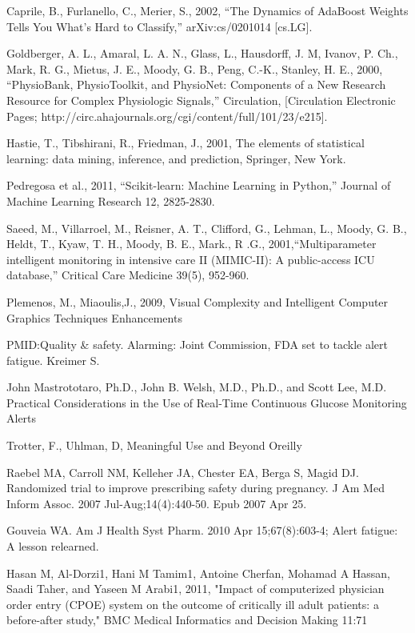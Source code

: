 \documentclass[12pt]{article}
\begin{document}
\begin{thebibliography}{1}
Caprile, B., Furlanello, C., Merier, S., 2002, ``The Dynamics of AdaBoost Weights Tells You What's Hard to Classify,'' arXiv:cs/0201014 [cs.LG].

Goldberger, A. L., Amaral, L. A. N., Glass, L., Hausdorff, J. M, Ivanov, P. Ch., Mark, R. G., Mietus, J. E., Moody, G. B., Peng, C.-K., Stanley, H. E., 2000, ``PhysioBank, PhysioToolkit, and PhysioNet: Components of a New Research Resource for Complex Physiologic Signals,'' Circulation, [Circulation Electronic Pages; http://circ.ahajournals.org/cgi/content/full/101/23/e215].

Hastie, T., Tibshirani, R., Friedman, J., 2001, The elements of statistical learning: data mining, inference, and prediction, Springer, New York.

Pedregosa et al., 2011, ``Scikit-learn: Machine Learning in Python,'' Journal of Machine Learning Research 12, 2825-2830.

Saeed, M., Villarroel, M., Reisner, A. T., Clifford, G., Lehman, L., Moody, G. B., Heldt, T., Kyaw, T. H., Moody, B. E., Mark., R .G., 2001,``Multiparameter intelligent monitoring in intensive care II (MIMIC-II): A public-access ICU database,'' Critical Care Medicine 39(5), 952-960.


Plemenos, M., Miaoulis,J., 2009, Visual Complexity and Intelligent Computer Graphics Techniques Enhancements


PMID:Quality \& safety. Alarming: Joint Commission, FDA set to tackle alert fatigue. Kreimer S.

John Mastrototaro, Ph.D., John B. Welsh, M.D., Ph.D., and Scott Lee, M.D.
Practical Considerations in the Use of Real-Time Continuous Glucose Monitoring Alerts

Trotter, F., Uhlman, D, Meaningful Use and Beyond Oreilly

Raebel MA, Carroll NM, Kelleher JA, Chester EA, Berga S, Magid DJ.
Randomized trial to improve prescribing safety during pregnancy.
J Am Med Inform Assoc. 2007 Jul-Aug;14(4):440-50. Epub 2007 Apr 25.

Gouveia WA. Am J Health Syst Pharm. 2010 Apr 15;67(8):603-4; Alert fatigue: A lesson relearned.

Hasan M, Al-Dorzi1, Hani M Tamim1, Antoine Cherfan, Mohamad A Hassan, Saadi Taher, and Yaseen M Arabi1, 2011, "Impact of computerized physician order entry (CPOE) system on the outcome of critically ill adult patients: a before-after study," BMC Medical Informatics and Decision Making 11:71


\end{thebibliography}
\end{document}
